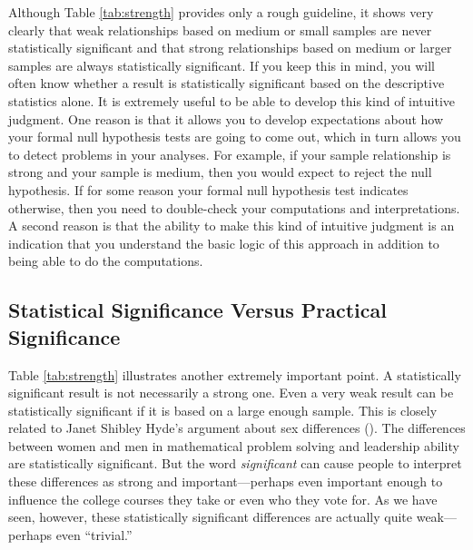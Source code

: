 \documentclass[
]{krantz}
\begin{document}
Although Table \ref{tab:strength} provides only a rough guideline, it shows very clearly that weak relationships based on medium or small samples are never statistically significant and that strong relationships based on medium or larger samples are always statistically significant. If you keep this in mind, you will often know whether a result is statistically significant based on the descriptive statistics alone. It is extremely useful to be able to develop this kind of intuitive judgment. One reason is that it allows you to develop expectations about how your formal null hypothesis tests are going to come out, which in turn allows you to detect problems in your analyses. For example, if your sample relationship is strong and your sample is medium, then you would expect to reject the null hypothesis. If for some reason your formal null hypothesis test indicates otherwise, then you need to double-check your computations and interpretations. A second reason is that the ability to make this kind of intuitive judgment is an indication that you understand the basic logic of this approach in addition to being able to do the computations.

\subsection*{Statistical Significance Versus Practical Significance}\label{statistical-significance-versus-practical-significance}


Table \ref{tab:strength} illustrates another extremely important point. A statistically significant result is not necessarily a strong one. Even a very weak result can be statistically significant if it is based on a large enough sample. This is closely related to Janet Shibley Hyde's argument about sex differences (). The differences between women and men in mathematical problem solving and leadership ability are statistically significant. But the word \emph{significant} can cause people to interpret these differences as strong and important---perhaps even important enough to influence the college courses they take or even who they vote for. As we have seen, however, these statistically significant differences are actually quite weak---perhaps even ``trivial.''
\end{document}
